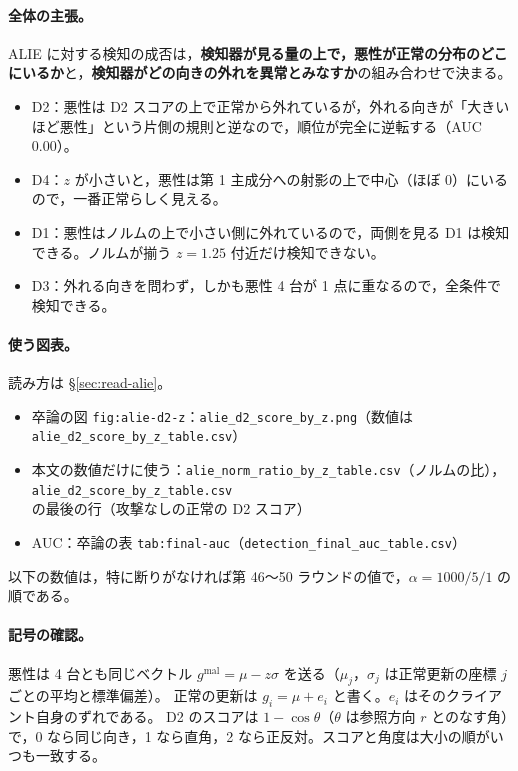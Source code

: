\documentclass[a4j, dvipdfmx]{jsarticle}  %
\begin{document}
\paragraph{全体の主張。}
ALIE に対する検知の成否は，\textbf{検知器が見る量の上で，悪性が正常の分布のどこにいるか}と，\textbf{検知器がどの向きの外れを異常とみなすか}の組み合わせで決まる。
\begin{itemize}
  \item D2：悪性は D2 スコアの上で正常から外れているが，外れる向きが「大きいほど悪性」という片側の規則と逆なので，順位が完全に逆転する（AUC 0.00）。
  \item D4：$z$ が小さいと，悪性は第 1 主成分への射影の上で中心（ほぼ 0）にいるので，一番正常らしく見える。
  \item D1：悪性はノルムの上で小さい側に外れているので，両側を見る D1 は検知できる。ノルムが揃う $z = 1.25$ 付近だけ検知できない。
  \item D3：外れる向きを問わず，しかも悪性 4 台が 1 点に重なるので，全条件で検知できる。
\end{itemize}

\paragraph{使う図表。}読み方は \S\ref{sec:read-alie}。
\begin{itemize}
  \item 卒論の図 \texttt{fig:alie-d2-z}：\texttt{alie\_d2\_score\_by\_z.png}（数値は \texttt{alie\_d2\_score\_by\_z\_table.csv}）
  \item 本文の数値だけに使う：\texttt{alie\_norm\_ratio\_by\_z\_table.csv}（ノルムの比），\texttt{alie\_d2\_score\_by\_z\_table.csv} の最後の行（攻撃なしの正常の D2 スコア）
  \item AUC：卒論の表 \texttt{tab:final-auc}（\texttt{detection\_final\_auc\_table.csv}）
\end{itemize}
以下の数値は，特に断りがなければ第 46〜50 ラウンドの値で，$\alpha = 1000 / 5 / 1$ の順である。

\paragraph{記号の確認。}
悪性は 4 台とも同じベクトル $g^{\mathrm{mal}} = \mu - z\sigma$ を送る（$\mu_j$，$\sigma_j$ は正常更新の座標 $j$ ごとの平均と標準偏差）。
正常の更新は $g_i = \mu + e_i$ と書く。$e_i$ はそのクライアント自身のずれである。
D2 のスコアは $1 - \cos\theta$（$\theta$ は参照方向 $r$ とのなす角）で，0 なら同じ向き，1 なら直角，2 なら正反対。スコアと角度は大小の順がいつも一致する。
\end{document}
